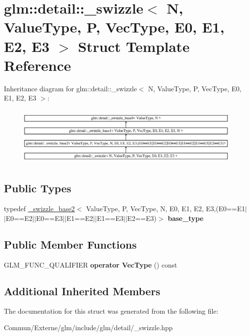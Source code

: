 \hypertarget{structglm_1_1detail_1_1__swizzle}{}\section{glm\+:\+:detail\+:\+:\+\_\+swizzle$<$ N, Value\+Type, P, Vec\+Type, E0, E1, E2, E3 $>$ Struct Template Reference}
\label{structglm_1_1detail_1_1__swizzle}
Inheritance diagram for glm\+:\+:detail\+:\+:\+\_\+swizzle$<$ N, Value\+Type, P, Vec\+Type, E0, E1, E2, E3 $>$\+:\begin{figure}[H]
\begin{center}
\leavevmode
\includegraphics[height=3.002681cm]{structglm_1_1detail_1_1__swizzle}
\end{center}
\end{figure}
\subsection*{Public Types}
\begin{DoxyCompactItemize}
\item 
typedef \hyperlink{structglm_1_1detail_1_1__swizzle__base2}{\+\_\+swizzle\+\_\+base2}$<$ Value\+Type, P, Vec\+Type, N, E0, E1, E2, E3,(E0==E1$\vert$$\vert$E0==E2$\vert$$\vert$E0==E3$\vert$$\vert$E1==E2$\vert$$\vert$E1==E3$\vert$$\vert$E2==E3)$>$ {\bfseries base\+\_\+type}\hypertarget{structglm_1_1detail_1_1__swizzle_acf7dfa9d7456eb833c247473c5a045f4}{}\label{structglm_1_1detail_1_1__swizzle_acf7dfa9d7456eb833c247473c5a045f4}

\end{DoxyCompactItemize}
\subsection*{Public Member Functions}
\begin{DoxyCompactItemize}
\item 
G\+L\+M\+\_\+\+F\+U\+N\+C\+\_\+\+Q\+U\+A\+L\+I\+F\+I\+ER {\bfseries operator Vec\+Type} () const \hypertarget{structglm_1_1detail_1_1__swizzle_a333cdd33d2fb442775cca23c77e63fca}{}\label{structglm_1_1detail_1_1__swizzle_a333cdd33d2fb442775cca23c77e63fca}

\end{DoxyCompactItemize}
\subsection*{Additional Inherited Members}


The documentation for this struct was generated from the following file\+:\begin{DoxyCompactItemize}
\item 
Commun/\+Externe/glm/include/glm/detail/\+\_\+swizzle.\+hpp\end{DoxyCompactItemize}
